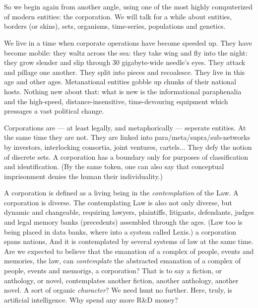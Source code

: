 \chapter{}

So we begin again from another angle, using one of the most highly computerized of modern entities: the corporation. We will talk for a while about entities, borders (or skins), sets, organisms, time-series, populations and genetics.

We live in a time when corporate operations have become speeded up. They have become mobile: they waltz across the sea: they take wing and fly into the night: they grow slender and slip through 30 gigabyte-wide needle's eyes. They attack and pillage one another. They split into pieces and recoalesce. They live in this age and other ages. Metanational entities gobble up chunks of their national hosts. Nothing new about that: what is new is the informational paraphenalia and the high-speed, distance-insensitive, time-devouring equipment which pressages a vast political change.

Corporations are --- at least legally, and metaphorically --- seperate entities. At the same time they are not. They are linked into para/meta/supra/sub-networks by investors, interlocking consortia, joint ventures, cartels... They defy the notion of discrete sets. A corporation has a boundary only for purposes of classification and identification. (By the same token, one can also say that conceptual imprisonment denies the human their individuality.)

A corporation is defined as a living being in the \emph{contemplation} of the Law. A corporation is diverse. The contemplating Law is also not only diverse, but dynamic and changeable, requiring lawyers, plaintiffs, litigants, defendants, judges and legal memory banks (precedents) assembled through the ages. (Law too is being placed in data banks, where into a system called Lexis.) a corporation spans nations, And it is contemplated by several systems of law at the same time. Are we expected to believe that the emanation of a complex of people, events and memories, the law, can \emph{contemplate} the abstracted emanation of a complex of people, events and memorigs, a corporation? That is to say a fiction, or anthology, or novel, contemplates another fiction, another anthology, another novel. A sort of organic \emph{character}? We need hunt no further. Here, truly, is artificial intelligence. Why spend any more R\&D money?


